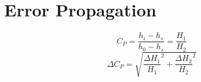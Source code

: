 \section{Error Propagation}
\begin{equation}
  C_P = \dfrac{h_i - h_s}{h_0 - h_s} = \dfrac{H_1}{H_2}
\end{equation}
\begin{equation}
  \Delta C_P = \sqrt{{\dfrac{\Delta H_1}{H_1}}^2 + {\dfrac{\Delta H_2}{H_2}}^2}
\end{equation}
